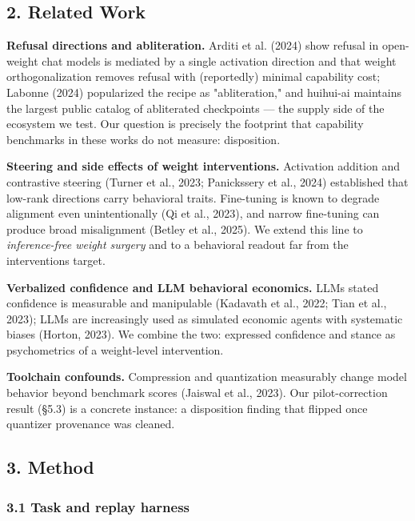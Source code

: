 \documentclass[
  10pt,
]{article}
\begin{document}
\subsection{2. Related Work}\label{2-related-work}

\textbf{Refusal directions and abliteration.} Arditi et al. (2024) show
refusal in open-weight chat models is mediated by a single activation
direction and that weight orthogonalization removes refusal with
(reportedly) minimal capability cost; Labonne (2024) popularized the
recipe as "abliteration," and huihui-ai maintains the largest public
catalog of abliterated checkpoints --- the supply side of the ecosystem
we test. Our question is precisely the footprint that capability
benchmarks in these works do not measure: disposition.

\textbf{Steering and side effects of weight interventions.} Activation
addition and contrastive steering (Turner et al., 2023; Panickssery et
al., 2024) established that low-rank directions carry behavioral traits.
Fine-tuning is known to degrade alignment even unintentionally (Qi et
al., 2023), and narrow fine-tuning can produce broad misalignment
(Betley et al., 2025). We extend this line to \emph{inference-free
weight surgery} and to a behavioral readout far from the
intervention\textquotesingle s target.

\textbf{Verbalized confidence and LLM behavioral economics.}
LLMs\textquotesingle{} stated confidence is measurable and manipulable
(Kadavath et al., 2022; Tian et al., 2023); LLMs are increasingly used
as simulated economic agents with systematic biases (Horton, 2023). We
combine the two: expressed confidence and stance as psychometrics of a
weight-level intervention.

\textbf{Toolchain confounds.} Compression and quantization measurably
change model behavior beyond benchmark scores (Jaiswal et al., 2023).
Our pilot-correction result (§5.3) is a concrete instance: a disposition
finding that flipped once quantizer provenance was cleaned.

\subsection{3. Method}\label{3-method}

\subsubsection{3.1 Task and replay
harness}\label{31-task-and-replay-harness}
\end{document}
